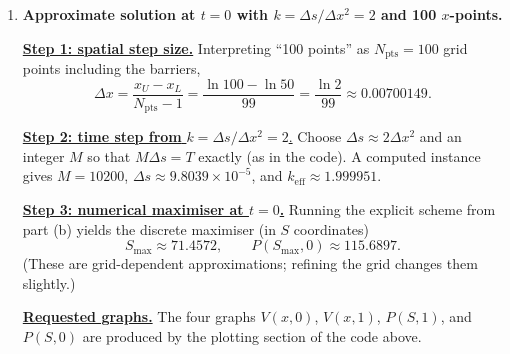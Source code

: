\documentclass{article}
\begin{document}
\begin{enumerate}
\begin{verbatim}
alpha = ds * a / dx**2
beta  = ds * b / (2.0 * dx)
gamma = ds * r

# Time-march forward in s from 0 to T (so from payoff back to t=0)
for m in range(M):
    Vnew = V.copy()
    Vnew[1:-1] = (V[1:-1]
                  + alpha*(V[2:] - 2*V[1:-1] + V[:-2])
                  + beta*(V[2:] - V[:-2])
                  - gamma*V[1:-1])
    Vnew[0] = 0.0
    Vnew[-1] = 0.0
    V = Vnew

V_t0 = V
payoff = (S - 50.0) * (100.0 - S)

# Plots requested (x-space and S-space)
plt.figure(); plt.plot(x, payoff); plt.title("V(x,0)=Payoff"); plt.xlabel("x"); plt.ylabel("V")
plt.figure(); plt.plot(x, V_t0);   plt.title("V(x,1)=Value at t=0"); plt.xlabel("x"); plt.ylabel("V")

plt.figure(); plt.plot(S, payoff); plt.title("P(S,1)=Payoff"); plt.xlabel("S"); plt.ylabel("P")
plt.figure(); plt.plot(S, V_t0);   plt.title("P(S,0)=Value at t=0"); plt.xlabel("S"); plt.ylabel("P")

jmax = np.argmax(V_t0)
print("k_eff =", k_eff)
print("max value =", V_t0[jmax], "at S =", S[jmax])

plt.show()
\end{verbatim}

\item[(c)] \textbf{Approximate solution at $t=0$ with $k=\Delta s/\Delta x^2=2$ and 100 $x$-points.}

\underline{\textbf{Step 1: spatial step size.}}
Interpreting ``100 points'' as $N_{\text{pts}}=100$ grid points including the barriers,
\[
\Delta x=\frac{x_U-x_L}{N_{\text{pts}}-1}
=\frac{\ln 100-\ln 50}{99}
=\frac{\ln 2}{99}\approx 0.00700149.
\]

\underline{\textbf{Step 2: time step from }$k=\Delta s/\Delta x^2=2$.}
Choose $\Delta s\approx 2\Delta x^2$ and an integer $M$ so that $M\Delta s=T$ exactly (as in the code).
A computed instance gives $M=10200$, $\Delta s\approx 9.8039\times 10^{-5}$, and $k_{\text{eff}}\approx 1.999951$.  %

\underline{\textbf{Step 3: numerical maximiser at $t=0$.}}
Running the explicit scheme from part (b) yields the discrete maximiser (in $S$ coordinates)
\[
\boxed{
S_{\max}\approx 71.4572,
\qquad
P(S_{\max},0)\approx 115.6897.
}
\]
(These are grid-dependent approximations; refining the grid changes them slightly.)  %

\underline{\textbf{Requested graphs.}}
The four graphs $V(x,0)$, $V(x,1)$, $P(S,1)$, and $P(S,0)$ are produced by the plotting section of the code above.


\end{enumerate}
\end{document}
